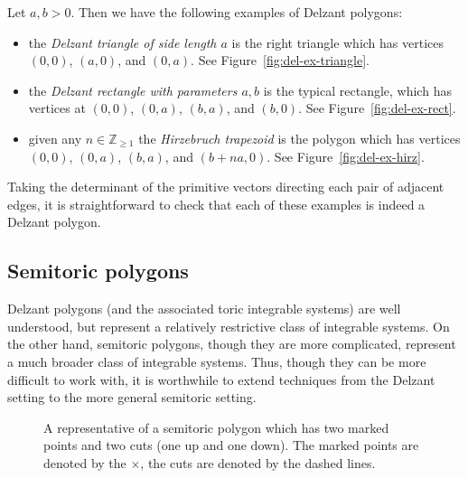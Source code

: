\documentclass[pdftex]{sigma}
\numberwithin{equation}{section}
\def\Z{{\mathbb Z}}
\begin{document}
\begin{Definition}\label{def:delz-examples}
 Let $a,b>0$. Then we have the following examples of Delzant polygons:
\begin{itemize}\itemsep=0pt
\item the \emph{Delzant triangle of side length $a$} is the right triangle which has vertices $(0,0)$, $(a,0)$, and $(0,a)$. See Figure~\ref{fig:del-ex-triangle}.

\item the \emph{Delzant rectangle with parameters $a,b$} is the typical rectangle, which has vertices at $(0,0)$, $(0,a)$, $(b,a)$, and $(b,0)$. See Figure~\ref{fig:del-ex-rect}.

\item given any $n\in \Z_{\geq 1}$ the \emph{Hirzebruch trapezoid} is the polygon which has vertices $(0,0)$, $(0,a)$, $(b,a)$,
and $(b+na,0)$. See Figure~\ref{fig:del-ex-hirz}.
\end{itemize}
\end{Definition}

Taking the determinant of the primitive vectors directing each pair of adjacent edges, it is straightforward to check that each of these examples is indeed a Delzant polygon.




\subsection{Semitoric polygons}
\label{sec:semitoric-poly}

Delzant polygons (and the associated toric integrable systems) are well understood, but represent a relatively restrictive class of integrable systems.
On the other hand, semitoric polygons, though they are more complicated, represent a much broader class of integrable systems.
Thus, though they can be more difficult to work with, it is worthwhile to extend techniques from the Delzant setting to the more general semitoric setting.



\begin{figure}
 \centering
 \caption{A representative of a semitoric polygon which has two marked points and two cuts (one up and one down). The marked points are denoted by the $\times$, the cuts are denoted by the dashed lines.}
 \label{fig:representative}
\end{figure}
\end{document}
